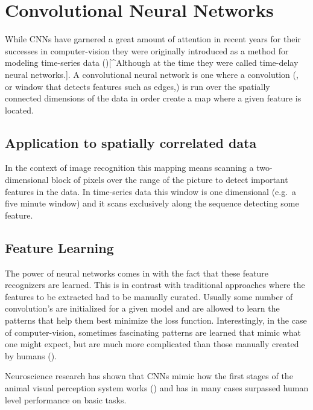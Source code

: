 \documentclass[]{book}
\theoremstyle{definition}
\theoremstyle{definition}
\theoremstyle{definition}
\theoremstyle{remark}
\begin{document}
\section{Convolutional Neural
Networks}\label{convolutional-neural-networks}

While CNNs have garnered a great amount of attention in recent years for
their successes in computer-vision they were originally introduced as a
method for modeling time-series data (\citet{hinton_cnn}){[}\^{}Although
at the time they were called time-delay neural networks.{]}. A
convolutional neural network is one where a convolution (, or window
that detects features such as edges,) is run over the spatially
connected dimensions of the data in order create a map where a given
feature is located.

\subsection{Application to spatially correlated
data}\label{application-to-spatially-correlated-data}

In the context of image recognition this mapping means scanning a
two-dimensional block of pixels over the range of the picture to detect
important features in the data. In time-series data this window is one
dimensional (e.g.~a five minute window) and it scans exclusively along
the sequence detecting some feature.

\subsection{Feature Learning}\label{feature-learning}

The power of neural networks comes in with the fact that these feature
recognizers are learned. This is in contrast with traditional approaches
where the features to be extracted had to be manually curated. Usually
some number of convolution's are initialized for a given model and are
allowed to learn the patterns that help them best minimize the loss
function. Interestingly, in the case of computer-vision, sometimes
fascinating patterns are learned that mimic what one might expect, but
are much more complicated than those manually created by humans
(\citet{cnn_vis}).

Neuroscience research has shown that CNNs mimic how the first stages of
the animal visual perception system works (\citet{cnn_animals}) and has
in many cases surpassed human level performance on basic tasks.
\end{document}

